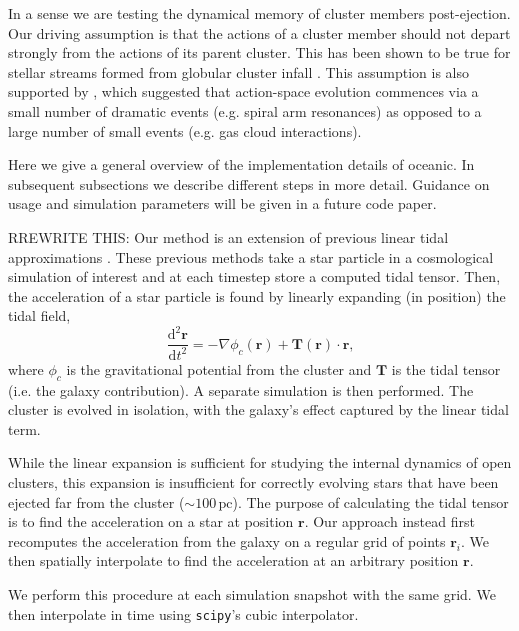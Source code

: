 \documentclass[11pt,letterpaper]{article}
\newcommand{\beq}{\begin{equation}}
\newcommand{\eeq}{\end{equation}}
\newcommand{\pc}{\text{pc}}
\newcommand{\dint}{\text{d}}
\begin{document}
\begin{multicols}{2}
In a sense we are testing the dynamical memory of cluster members post-ejection. Our driving assumption is that the actions of a cluster member should not depart strongly from the actions of its parent cluster. This has been shown to be true for stellar streams formed from globular cluster infall \citep{Eyre11:MechTidalStreams}. This assumption is also supported by \citet{Beane18:Actions}, which suggested that action-space evolution commences via a small number of dramatic events (e.g. spiral arm resonances) as opposed to a large number of small events (e.g. gas cloud interactions).


Here we give a general overview of the implementation details of oceanic. In subsequent subsections we describe different steps in more detail. Guidance on usage and simulation parameters will be given in a future code paper.

RREWRITE THIS: Our method is an extension of previous linear tidal approximations \citep{Renaud11:NBODY6tt,Mamikonyan17:Kira}. These previous methods take a star particle in a cosmological simulation of interest and at each timestep store a computed tidal tensor. Then, the acceleration of a star particle is found by linearly expanding (in position) the tidal field,
\beq\label{eq:tidal_linear}
\frac{\dint^2 \bm{r}}{\dint t^2} = - \nabla \phi_c(\bm{r}) + \bm{T}(\bm{r}) \cdot \bm{r}\text{,}
\eeq
where $\phi_c$ is the gravitational potential from the cluster and $\bm{T}$ is the tidal tensor (i.e. the galaxy contribution). A separate simulation is then performed. The cluster is evolved in isolation, with the galaxy's effect captured by the linear tidal term.

While the linear expansion is sufficient for studying the internal dynamics of open clusters, this expansion is insufficient for correctly evolving stars that have been ejected far from the cluster ($\sim 100\,\pc$). The purpose of calculating the tidal tensor is to find the acceleration on a star at position $\bm{r}$. Our approach instead first recomputes the acceleration from the galaxy on a regular grid of points $\bm{r}_i$. We then spatially interpolate to find the acceleration at an arbitrary position $\bm{r}$.

We perform this procedure at each simulation snapshot with the same grid. We then interpolate in time using \texttt{scipy}'s cubic interpolator.



\end{multicols}
\end{document}
